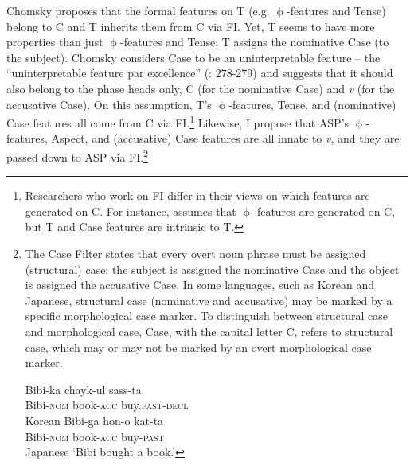 Chomsky proposes that the formal features on T (e.g. $\upphi$-features and Tense) belong to C and T inherits them from C via \ac{FI}. Yet, T seems to have more properties than just $\upphi$-features and Tense; T assigns the nominative Case (to the subject). Chomsky considers Case to be an uninterpretable feature – the ``uninterpretable feature par excellence'' (\citeyear{Chomsky1995}: 278-279) and suggests that it should also belong to the phase heads only, C (for the nominative Case) and \textit{v} (for the accusative Case). On this assumption, T’s $\upphi$-features, Tense, and (nominative) Case features all come from C via \ac{FI}.\footnote{Researchers who work on \ac{FI} differ in their views on which features are generated on C. For instance, \citet{Gallego2010} assumes that $\upphi$-features are generated on C, but T and Case features are intrinsic to T.} Likewise, I propose that \ac{ASP}'s $\upphi$-features, Aspect, and (accusative) Case features are all innate to \textit{v}, and they are passed down to \ac{ASP} via \ac{FI}.\footnote{The Case Filter \citep{Chomsky1981} states that every overt noun phrase must be assigned (structural) case: the subject is assigned the nominative Case and the object is assigned the accusative Case. In some languages, such as Korean and Japanese, structural case (nominative and accusative) may be marked by a specific morphological case marker. To distinguish between structural case and morphological case, Case, with the capital letter C, refers to structural case, which may or may not be marked by an overt morphological case marker.

\ea\label{ex:fn50}
    \ea \gll Bibi-ka      chayk-ul  sass-ta    \\
    Bibi-\textsc{nom} book-\textsc{acc}  buy.\textsc{past-decl} \\
  \hfill Korean
    \ex \gll Bibi-ga      hon-o        kat-ta  \\
    Bibi-\textsc{nom} book-\textsc{acc} buy-\textsc{past} \\ \hfill Japanese
    \glt `Bibi bought a book.'
    \zlast
\zlast}

